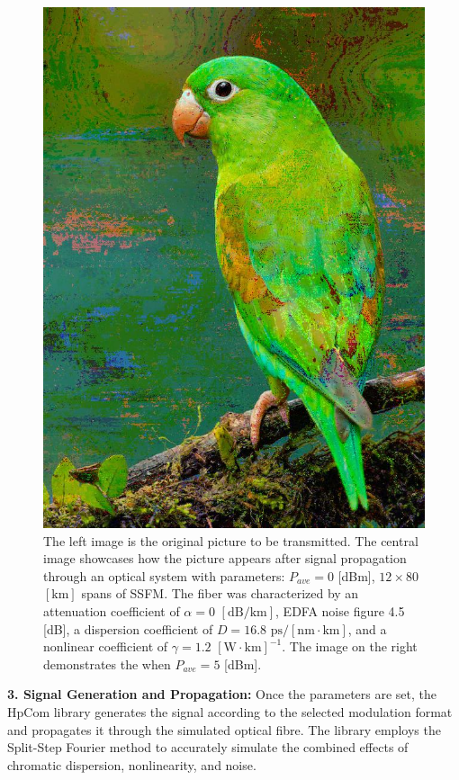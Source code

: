 \begin{figure}
\begin{minipage}[c]{0.33\linewidth}
    \includegraphics[width=1.\linewidth]{images/hpcom/parrot3_rx2.jpg}
  \end{minipage}
  \caption{
  The left image is the original picture to be transmitted. The central image showcases how the picture appears after signal propagation through an optical system with parameters: $P_{ave}=0$ \textrm{[dBm]}, $12 \times 80$ $[\textrm{km}]$ spans of SSFM. The fiber was characterized by an attenuation coefficient of $\alpha = 0$ $[\textrm{dB}/\textrm{km}]$, EDFA noise figure 4.5 \textrm{[dB]}, a dispersion coefficient of $D = 16.8$ $\textrm{ps}/[\textrm{nm} \cdot \textrm{km}]$, and a nonlinear coefficient of $\gamma = 1.2$ $[\textrm{W} \cdot \textrm{km}]^{-1}$. The image on the right demonstrates the when $P_{ave} = 5$ \textrm{[dBm]}.
  }
  \label{fig:demo_example}
\end{figure}

\textbf{3. Signal Generation and Propagation:} Once the parameters are set, the HpCom library generates the signal according to the selected modulation format and propagates it through the simulated optical fibre. The library employs the Split-Step Fourier method to accurately simulate the combined effects of chromatic dispersion, nonlinearity, and noise. 



